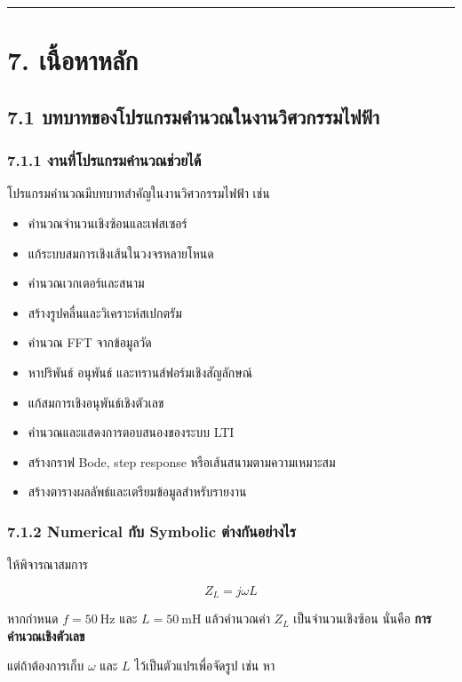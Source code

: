 \par\noindent\rule{\textwidth}{0.4pt}\par

\section{7. เนื้อหาหลัก}

\subsection{7.1 บทบาทของโปรแกรมคำนวณในงานวิศวกรรมไฟฟ้า}

\subsubsection{7.1.1 งานที่โปรแกรมคำนวณช่วยได้}

โปรแกรมคำนวณมีบทบาทสำคัญในงานวิศวกรรมไฟฟ้า เช่น

\begin{itemize}
    \item คำนวณจำนวนเชิงซ้อนและเฟสเซอร์
    \item แก้ระบบสมการเชิงเส้นในวงจรหลายโหนด
    \item คำนวณเวกเตอร์และสนาม
    \item สร้างรูปคลื่นและวิเคราะห์สเปกตรัม
    \item คำนวณ FFT จากข้อมูลวัด
    \item หาปริพันธ์ อนุพันธ์ และทรานส์ฟอร์มเชิงสัญลักษณ์
    \item แก้สมการเชิงอนุพันธ์เชิงตัวเลข
    \item คำนวณและแสดงการตอบสนองของระบบ LTI
    \item สร้างกราฟ Bode, step response หรือเส้นสนามตามความเหมาะสม
    \item สร้างตารางผลลัพธ์และเตรียมข้อมูลสำหรับรายงาน
\end{itemize}

\subsubsection{7.1.2 Numerical กับ Symbolic ต่างกันอย่างไร}

ให้พิจารณาสมการ

\[
Z_L = j\omega L
\]

หากกำหนด $f=50\ \text{Hz}$ และ $L=50\ \text{mH}$ แล้วคำนวณค่า $Z_L$ เป็นจำนวนเชิงซ้อน นั่นคือ \textbf{การคำนวณเชิงตัวเลข}

แต่ถ้าต้องการเก็บ $\omega$ และ $L$ ไว้เป็นตัวแปรเพื่อจัดรูป เช่น หา

